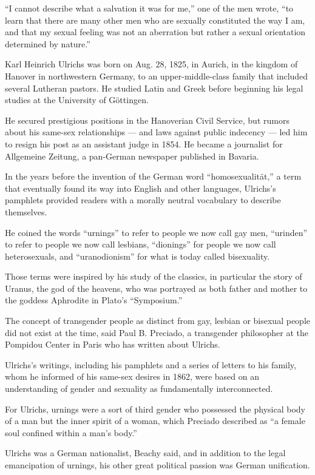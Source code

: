``I cannot describe what a salvation it was for me,'' one of the men
wrote, ``to learn that there are many other men who are sexually
constituted the way I am, and that my sexual feeling was not an
aberration but rather a sexual orientation determined by nature.''

Karl Heinrich Ulrichs was born on Aug. 28, 1825, in Aurich, in the
kingdom of Hanover in northwestern Germany, to an upper-middle-class
family that included several Lutheran pastors. He studied Latin and
Greek before beginning his legal studies at the University of Göttingen.

He secured prestigious positions in the Hanoverian Civil Service, but
rumors about his same-sex relationships --- and laws against public
indecency --- led him to resign his post as an assistant judge in 1854.
He became a journalist for Allgemeine Zeitung, a pan-German newspaper
published in Bavaria.

In the years before the invention of the German word ``homosexualität,''
a term that eventually found its way into English and other languages,
Ulrichs's pamphlets provided readers with a morally neutral vocabulary
to describe themselves.

He coined the words ``urnings'' to refer to people we now call gay men,
``urinden'' to refer to people we now call lesbians, ``dionings'' for
people we now call heterosexuals, and ``uranodionism'' for what is today
called bisexuality.

Those terms were inspired by his study of the classics, in particular
the story of Uranus, the god of the heavens, who was portrayed as both
father and mother to the goddess Aphrodite in Plato's ``Symposium.''

The concept of transgender people as distinct from gay, lesbian or
bisexual people did not exist at the time, said Paul B. Preciado, a
transgender philosopher at the Pompidou Center in Paris who has written
about Ulrichs.

Ulrichs's writings, including his pamphlets and a series of letters to
his family, whom he informed of his same-sex desires in 1862, were based
on an understanding of gender and sexuality as fundamentally
interconnected.

For Ulrichs, urnings were a sort of third gender who possessed the
physical body of a man but the inner spirit of a woman, which Preciado
described as ``a female soul confined within a man's body.''

Ulrichs was a German nationalist, Beachy said, and in addition to the
legal emancipation of urnings, his other great political passion was
German unification.

